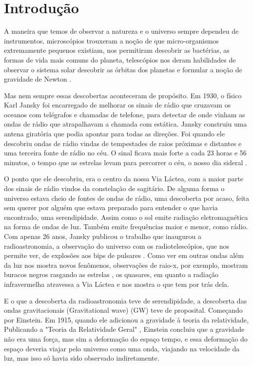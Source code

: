 \chapter{Introdução}
A maneira que temos de observar a natureza e o universo sempre dependeu de instrumentos, microscópios trouxeram a noção de que micro-organismos extremamente pequenos existiam, nos permitiram descobrir as bactérias, as formas de vida mais comuns do planeta, telescópios nos deram habilidades de observar o sistema solar descobrir as órbitas dos planetas e formular a noção de gravidade de Newton \cite{newton1687philosophiae}. 

Mas nem sempre essas descobertas aconteceram de propósito. Em 1930, o físico Karl Jansky foi encarregado de melhorar os sinais de rádio que cruzavam os oceanos com telégrafos e chamadas de telefone, para detectar de onde vinham as ondas de rádio que atrapalhavam a chamada com estática. Jansky construiu uma antena giratória que podia apontar para todas as direções. Foi quando ele descobriu ondas de rádio vindas de tempestades de raios próximas e distantes e uma terceira fonte de rádio no céu. O sinal ficava mais forte a cada 23 horas e 56 minutos, o tempo que as estrelas levam para percorrer o céu, o nosso dia sideral \cite{singh2010big}. 

O ponto que ele descobriu, era o centro da nossa Via Láctea, com a maior parte dos sinais de rádio vindos da constelação de sagitário. De alguma forma o universo estava cheio de fontes de ondas de rádio, uma descoberta por acaso, feita sem querer por alguém que estava preparado para entender o que havia encontrado, uma serendipidade. 
Assim como o sol emite radiação eletromagnética na forma de ondas de luz. Também emite frequências maior e menor, como rádio. Com apenas 26 anos, Jansky publicou o trabalho que inaugurou a radioastronomia, a observação do universo com os radiotelescópios, que nos permite ver, de explosões aos bips de pulsares \cite{jansky1932directional}. Como ver em outras ondas além da luz nos mostra novos fenômenos, observações de raio-x, por exemplo, mostram buracos negros rasgando as estrelas \cite{200814}, os quasares, em quanto a radiação infravermelha atravessa a Via Láctea e nos mostra o que tem por trás dela. 

E o que a descoberta da radioastronomia teve de serendipidade, a descoberta das ondas gravitacionais (Gravitational wave) (GW) teve de proposital. Começando por Einstein. Em 1915, quando ele adicionou a gravidade à teoria da relatividade, Publicando a "Teoria da Relatividade Geral" \cite{albert1920realtivity}, Einstein concluiu que a gravidade não era uma força, mas sim a deformação do espaço tempo, e essa deformação do espaço deveria viajar pelo universo como uma onda, viajando na velocidade da luz, mas isso só havia sido observado indiretamente. 

